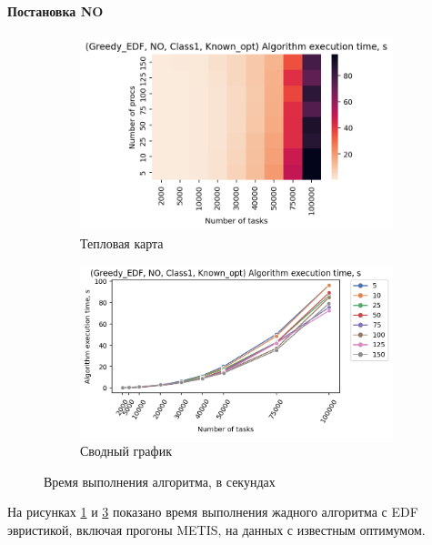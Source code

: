 \paragraph{Постановка NO}

\begin{figure}[!htbp]
    \centering
    \begin{subfigure}{0.49\textwidth}
        \includegraphics[width=\textwidth]{imgs/ideal_1/NO_EDF/et_heatmap.png}
        \caption{Тепловая карта}
        \label{fig:NO-EDF-exec-time-heatmap}
    \end{subfigure}
    \hfill
    \begin{subfigure}{0.49\textwidth}
        \includegraphics[width=\textwidth]{imgs/ideal_1/NO_EDF/tr_graph.png}
        \caption{Сводный график}
        \label{fig:NO-EDF-exec-time-compiled}
    \end{subfigure}
    \caption{Время выполнения алгоритма, в секундах}
\end{figure}

На рисунках \ref{fig:NO-EDF-exec-time-heatmap} и \ref{fig:NO-EDF-exec-time-compiled} показано время выполнения жадного алгоритма с EDF эвристикой, включая прогоны METIS, на данных с известным оптимумом.

